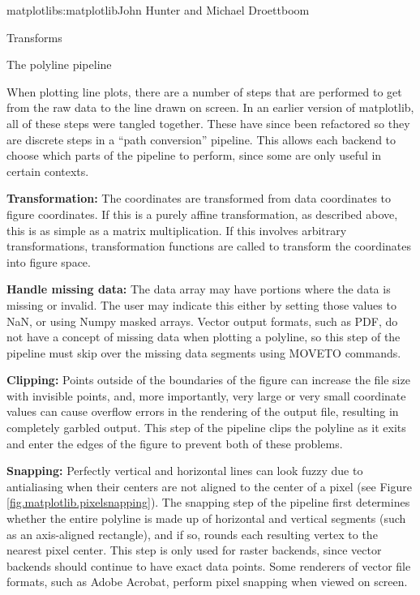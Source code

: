 \begin{aosachapter}{matplotlib}{s:matplotlib}{John Hunter and Michael Droettboom}
\begin{aosasect1}{Transforms}

\end{aosasect1}

\begin{aosasect1}{The polyline pipeline}

When plotting line plots, there are a number of steps that are
performed to get from the raw data to the line drawn on screen.  In an
earlier version of matplotlib, all of these steps were tangled
together.  These have since been refactored so they are discrete steps
in a ``path conversion'' pipeline.  This allows each backend to choose
which parts of the pipeline to perform, since some are only useful in
certain contexts.

\begin{aosaenumerate}

\item \textbf{Transformation:} The coordinates are transformed from data
  coordinates to figure coordinates.  If this is a purely affine
  transformation, as described above, this is as simple as a matrix
  multiplication.  If this involves arbitrary transformations,
  transformation functions are called to transform the coordinates
  into figure space.

\item \textbf{Handle missing data:} The data array may have portions
  where the data is missing or invalid.  The user may indicate this
  either by setting those values to NaN, or using Numpy masked arrays.
  Vector output formats, such as PDF, do not have a concept of missing
  data when plotting a polyline, so this step of the pipeline must
  skip over the missing data segments using MOVETO commands.

\item \textbf{Clipping:} Points outside of the boundaries of the
  figure can increase the file size with invisible points, and, more
  importantly, very large or very small coordinate values can cause
  overflow errors in the rendering of the output file, resulting in
  completely garbled output.  This step of the pipeline clips the
  polyline as it exits and enter the edges of the figure to prevent
  both of these problems.

\item \textbf{Snapping:} Perfectly vertical and horizontal lines can
  look fuzzy due to antialiasing when their centers are not aligned to
  the center of a pixel (see Figure
  \ref{fig.matplotlib.pixelsnapping}).  The snapping step of the
  pipeline first determines whether the entire polyline is made up of
  horizontal and vertical segments (such as an axis-aligned
  rectangle), and if so, rounds each resulting vertex to the nearest
  pixel center.  This step is only used for raster backends, since
  vector backends should continue to have exact data points.  Some
  renderers of vector file formats, such as Adobe Acrobat, perform
  pixel snapping when viewed on screen.


\end{aosaenumerate}
\end{aosasect1}
\end{aosachapter}

